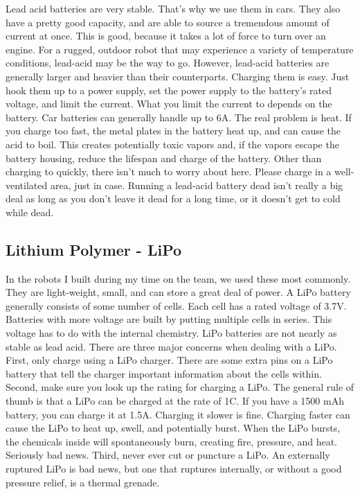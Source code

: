 Lead acid batteries are very stable. That's why we use them in cars. They also have a pretty good capacity, and are able to source a tremendous amount of current at once. This is good, because it takes a lot of force to turn over an engine. For a rugged, outdoor robot that may experience a variety of temperature conditions, lead-acid may be the way to go. However, lead-acid batteries are generally larger and heavier than their counterparts. Charging them is easy. Just hook them up to a power supply, set the power supply to the battery's rated voltage, and limit the current. What you limit the current to depends on the battery. Car batteries can generally handle up to 6A. The real problem is heat. If you charge too fast, the metal plates in the battery heat up, and can cause the acid to boil. This creates potentially toxic vapors and, if the vapors escape the battery housing, reduce the lifespan and charge of the battery. Other than charging to quickly, there isn't much to worry about here. Please charge in a well-ventilated area, just in case. Running a lead-acid battery dead isn't really a big deal as long as you don't leave it dead for a long time, or it doesn't get to cold while dead.

\subsection{Lithium Polymer - LiPo}

In the robots I built during my time on the team, we used these most commonly. They are light-weight, small, and can store a great deal of power. A LiPo battery generally consists of some number of cells. Each cell has a rated voltage of 3.7V. Batteries with more voltage are built by putting multiple cells in series. This voltage has to do with the internal chemistry. LiPo batteries are not nearly as stable as lead acid. There are three major concerns when dealing with a LiPo. First, only charge using a LiPo charger. There are some extra pins on a LiPo battery that tell the charger important information about the cells within. Second, make sure you look up the rating for charging a LiPo. The general rule of thumb is that a LiPo can be charged at the rate of 1C. If you have a 1500 mAh battery, you can charge it at 1.5A. Charging it slower is fine. Charging faster can cause the LiPo to heat up, swell, and potentially burst. When the LiPo bursts, the chemicals inside will spontaneously burn, creating fire, pressure, and heat. Seriously bad news. Third, never ever cut or puncture a LiPo. An externally ruptured LiPo is bad news, but one that ruptures internally, or without a good pressure relief, is a thermal grenade.

